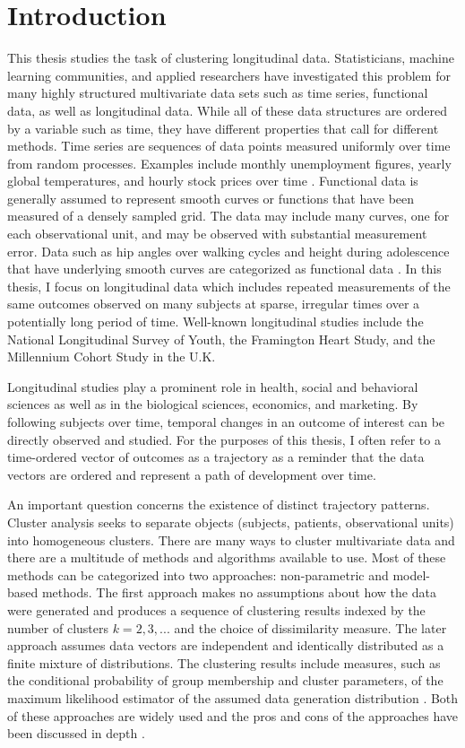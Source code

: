 \chapter{Introduction}
\label{chap: intro}

This thesis studies the task of clustering longitudinal data. Statisticians, machine learning communities, and applied researchers have investigated this problem for many highly structured multivariate data sets such as time series, functional data, as well as longitudinal data. While all of these data structures are ordered by a variable such as time, they have different properties that call for different methods. Time series are sequences of data points measured uniformly over time from random processes. Examples include monthly unemployment figures, yearly global temperatures, and hourly stock prices over time \cite{shumway2011}. Functional data is generally assumed to represent smooth curves or functions that have been measured of a densely sampled grid. The data may include many curves, one for each observational unit, and may be observed with substantial measurement error. Data such as hip angles over walking cycles and height during adolescence that have underlying smooth curves are categorized as functional data \cite{ramsay2002}. In this thesis, I focus on longitudinal data which includes repeated measurements of the same outcomes observed on many subjects at sparse, irregular times over a potentially long period of time. Well-known longitudinal studies include the National Longitudinal Survey of Youth, the Framington Heart Study, and the Millennium Cohort Study in the U.K. 

Longitudinal studies play a prominent role in health, social and behavioral sciences as well as in the biological sciences, economics, and marketing. By following subjects over time, temporal changes in an outcome of interest can be directly observed and studied. For the purposes of this thesis, I often refer to a time-ordered vector of outcomes as a trajectory as a reminder that the data vectors are ordered and represent a path of development over time. 

An important question concerns the existence of distinct trajectory patterns. Cluster analysis seeks to separate objects (subjects, patients, observational units) into homogeneous clusters. There are many ways to cluster multivariate data and there are a multitude of methods and algorithms available to use. Most of these methods can be categorized into two approaches: non-parametric and model-based methods. The first approach makes no assumptions about how the data were generated and produces a sequence of clustering results indexed by the number of clusters $k=2,3,...$ and the choice of dissimilarity measure. The later approach assumes data vectors are independent and identically distributed as a finite mixture of distributions. The clustering results include measures, such as the conditional probability of group membership and cluster parameters, of the maximum likelihood estimator of the assumed data generation distribution \cite{mclachlan2000,fraley1998}. Both of these approaches are widely used and the pros and cons of the approaches have been discussed in depth \cite{magidson2002, everitt1981}.

